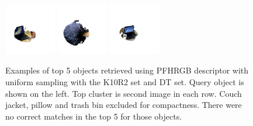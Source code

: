 \documentclass[11pt,a4paper]{kth-mag}
\begin{document}
\begin{figure}
{{      \includegraphics[width=0.2\textwidth]{images/queryresults/laptop_2}
      \includegraphics[width=0.2\textwidth]{images/queryresults/laptop_3}
      \includegraphics[width=0.2\textwidth]{images/queryresults/laptop_4}
    }\\
  }
  \caption{Examples of top 5 objects retrieved using PFHRGB descriptor with uniform
    sampling with the K10R2 set and DT set. Query object is shown on the left.
    Top cluster is second image in each row. Couch jacket, pillow and trash bin
    excluded for compactness. There were no correct matches in the top 5 for
    those objects.}
  \label{fig:retrieval}
\end{figure}
\printbibliography
\end{document}
